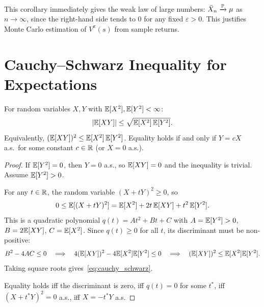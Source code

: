 \documentclass[11pt,a4paper]{article}
\begin{document}
\begin{remark}
This corollary immediately gives the weak law of large numbers:
$\bar{X}_n \xrightarrow{\mathbb{P}} \mu$ as $n \to \infty$, since the right-hand
side tends to $0$ for any fixed $\varepsilon > 0$.  This
justifies Monte Carlo estimation of $V^\pi(s)$ from sample
returns.
\end{remark}


\section{Cauchy--Schwarz Inequality for Expectations}
\label{sec:cauchy_schwarz}

\begin{theorem}
\label{thm:cauchy_schwarz}
For random variables $X, Y$ with
$\mathbb{E}[X^2], \mathbb{E}[Y^2] < \infty$:
\begin{equation}
  |\mathbb{E}[XY]| \leq \sqrt{\mathbb{E}[X^2]\, \mathbb{E}[Y^2]}.
  \label{eq:cauchy_schwarz}
\end{equation}
Equivalently, $(\mathbb{E}[XY])^2 \leq \mathbb{E}[X^2]\, \mathbb{E}[Y^2]$.
Equality holds if and only if $Y = cX$ a.s.\ for some constant
$c \in \mathbb{R}$ (or $X = 0$ a.s.).
\end{theorem}

\begin{proof}
If $\mathbb{E}[Y^2] = 0$, then $Y = 0$ a.s., so $\mathbb{E}[XY] = 0$ and
the inequality is trivial.  Assume $\mathbb{E}[Y^2] > 0$.

For any $t \in \mathbb{R}$, the random variable $(X + tY)^2 \geq 0$, so
\begin{equation}
  0 \leq \mathbb{E}[(X + tY)^2]
  = \mathbb{E}[X^2] + 2t\,\mathbb{E}[XY] + t^2\,\mathbb{E}[Y^2].
  \label{eq:cs_quadratic}
\end{equation}
This is a quadratic polynomial $q(t) = At^2 + Bt + C$ with
$A = \mathbb{E}[Y^2] > 0$, $B = 2\mathbb{E}[XY]$, $C = \mathbb{E}[X^2]$.  Since
$q(t) \geq 0$ for all $t$, its discriminant must be
non-positive:
\begin{equation}
  B^2 - 4AC \leq 0
  \quad\Longrightarrow\quad
  4(\mathbb{E}[XY])^2 - 4\mathbb{E}[X^2]\mathbb{E}[Y^2] \leq 0
  \quad\Longrightarrow\quad
  (\mathbb{E}[XY])^2 \leq \mathbb{E}[X^2]\mathbb{E}[Y^2].
  \label{eq:cs_discrim}
\end{equation}
Taking square roots gives~\eqref{eq:cauchy_schwarz}.

Equality holds iff the discriminant is zero, iff $q(t) = 0$ for
some $t^*$, iff $(X + t^* Y)^2 = 0$ a.s., iff $X = -t^* Y$
a.s.
\end{proof}
\end{document}
